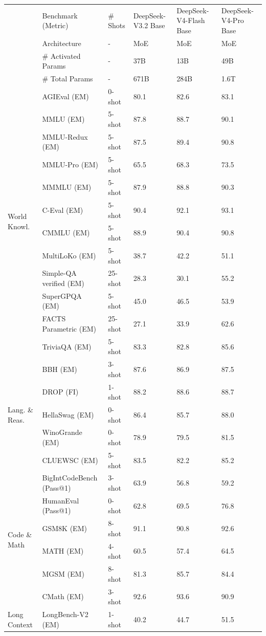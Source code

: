 \documentclass[
  10
]{article}
\newcounter{none} %
\begin{document}
{\def\LTcaptype{none} %
\begin{longtable}[]{@{}llllll@{}}
\toprule\noalign{}
\endhead
\bottomrule\noalign{}
\endlastfoot
& Benchmark (Metric) & \# Shots & DeepSeek-V3.2 Base & DeepSeek-V4-Flash
Base & DeepSeek-V4-Pro Base \\
& Architecture & - & MoE & MoE & MoE \\
& \# Activated Params & - & 37B & 13B & 49B \\
& \# Total Params & - & 671B & 284B & 1.6T \\
\multirow{12}{*}{World Knowl.} & AGIEval (EM) & 0-shot & 80.1 & 82.6 &
83.1 \\
& MMLU (EM) & 5-shot & 87.8 & 88.7 & 90.1 \\
& MMLU-Redux (EM) & 5-shot & 87.5 & 89.4 & 90.8 \\
& MMLU-Pro (EM) & 5-shot & 65.5 & 68.3 & 73.5 \\
& MMMLU (EM) & 5-shot & 87.9 & 88.8 & 90.3 \\
& C-Eval (EM) & 5-shot & 90.4 & 92.1 & 93.1 \\
& CMMLU (EM) & 5-shot & 88.9 & 90.4 & 90.8 \\
& MultiLoKo (EM) & 5-shot & 38.7 & 42.2 & 51.1 \\
& Simple-QA verified (EM) & 25-shot & 28.3 & 30.1 & 55.2 \\
& SuperGPQA (EM) & 5-shot & 45.0 & 46.5 & 53.9 \\
& FACTS Parametric (EM) & 25-shot & 27.1 & 33.9 & 62.6 \\
& TriviaQA (EM) & 5-shot & 83.3 & 82.8 & 85.6 \\
\multirow{5}{*}{Lang. \& Reas.} & BBH (EM) & 3-shot & 87.6 & 86.9 &
87.5 \\
& DROP (FI) & 1-shot & 88.2 & 88.6 & 88.7 \\
& HellaSwag (EM) & 0-shot & 86.4 & 85.7 & 88.0 \\
& WinoGrande (EM) & 0-shot & 78.9 & 79.5 & 81.5 \\
& CLUEWSC (EM) & 5-shot & 83.5 & 82.2 & 85.2 \\
\multirow{6}{*}{Code \& Math} & BigIntCodeBench (Pass@1) & 3-shot & 63.9
& 56.8 & 59.2 \\
& HumanEval (Pass@1) & 0-shot & 62.8 & 69.5 & 76.8 \\
& GSM8K (EM) & 8-shot & 91.1 & 90.8 & 92.6 \\
& MATH (EM) & 4-shot & 60.5 & 57.4 & 64.5 \\
& MGSM (EM) & 8-shot & 81.3 & 85.7 & 84.4 \\
& CMath (EM) & 3-shot & 92.6 & 93.6 & 90.9 \\
Long Context & LongBench-V2 (EM) & 1-shot & 40.2 & 44.7 & 51.5 \\
\end{longtable}
}
\end{document}
